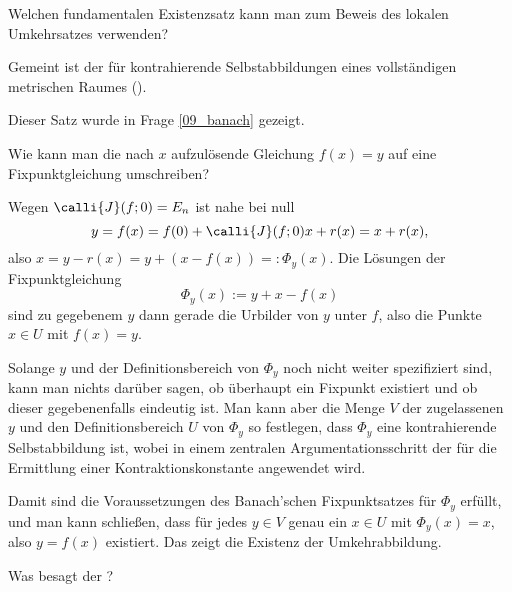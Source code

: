 \begin{frage}\label{10_umkbanach}
  Welchen fundamentalen Existenzsatz kann man zum Beweis des 
  lokalen Umkehrsatzes verwenden?
\end{frage}

\begin{antwort}
  Gemeint ist der  
  für kontrahierende 
  Selbstabbildungen eines vollständigen metrischen Raumes 
  (). 
  
  Dieser Satz wurde in Frage \ref{09_banach} gezeigt.  \AntEnd
\end{antwort}

\begin{frage}
  Wie kann man die nach $x$ aufzulösende Gleichung $f(x)=y$ auf 
  eine Fixpunktgleichung umschreiben?
\end{frage}

\begin{antwort}
  Wegen $\calli{J}(f;0)=E_n$ ist nahe bei null 
  \[
  y= f(x) =f(0)+ \calli{J}(f;0) x + r(x) = x+ r(x),
  \]
  also $x=y-r(x)=y+(x-f(x))=: \Phi_y (x)$. 
  Die Lösungen der Fixpunktgleichung
  \[
  \Phi_y( x ) := y+x-f(x)
  \]
  sind zu gegebenem $y$ dann gerade die Urbilder von $y$ unter $f$, 
  also die Punkte $x\in U$ mit $f(x)=y$. 

  Solange $y$ und der Definitionsbereich von $\Phi_y$ noch nicht 
  weiter spezifiziert sind, kann man nichts darüber sagen, ob überhaupt 
  ein Fixpunkt existiert und ob dieser gegebenenfalls eindeutig ist. 
  Man kann aber die Menge $V$ der zugelassenen $y$ und den Definitionsbereich 
  $U$ von $\Phi_y$ so festlegen, dass $\Phi_y$ eine kontrahierende 
  Selbstabbildung ist, wobei in einem zentralen Argumentationsschritt der 
   für die Ermittlung einer Kontraktionskonstante 
  angewendet wird. 

  Damit sind die Voraussetzungen des Banach'schen Fixpunktsatzes 
  für $\Phi_y$ erfüllt, und man kann schließen, dass für jedes 
  $y\in V$ genau ein $x\in U$ mit $\Phi_y(x)=x$, also $y=f(x)$ existiert. 
  Das zeigt die Existenz der Umkehrabbildung.   
  \AntEnd
\end{antwort}



\begin{frage}
  Was besagt der ?
\end{frage}


